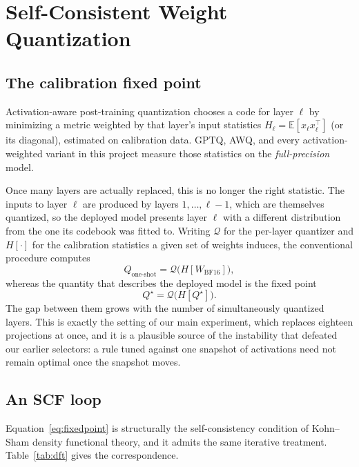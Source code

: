 \section{Self-Consistent Weight Quantization}
\label{sec:scq}

\subsection{The calibration fixed point}

Activation-aware post-training quantization chooses a code for layer $\ell$ by
minimizing a metric weighted by that layer's input statistics
$H_\ell=\mathbb E[x_\ell x_\ell^\top]$ (or its diagonal), estimated on
calibration data. GPTQ, AWQ, and every activation-weighted variant in this
project measure those statistics on the \emph{full-precision} model.

Once many layers are actually replaced, this is no longer the right statistic.
The inputs to layer $\ell$ are produced by layers $1,\dots,\ell-1$, which are
themselves quantized, so the deployed model presents layer $\ell$ with a
different distribution from the one its codebook was fitted to. Writing
$\mathcal Q$ for the per-layer quantizer and $H[\cdot]$ for the calibration
statistics a given set of weights induces, the conventional procedure computes
\begin{equation}
 Q_{\text{one-shot}} = \mathcal Q\bigl(H[W_{\text{BF16}}]\bigr),
\end{equation}
whereas the quantity that describes the deployed model is the fixed point
\begin{equation}
 Q^\star = \mathcal Q\bigl(H[Q^\star]\bigr).
 \label{eq:fixedpoint}
\end{equation}
The gap between them grows with the number of simultaneously quantized layers.
This is exactly the setting of our main experiment, which replaces eighteen
projections at once, and it is a plausible source of the instability that
defeated our earlier selectors: a rule tuned against one snapshot of
activations need not remain optimal once the snapshot moves.

\subsection{An SCF loop}

Equation~\eqref{eq:fixedpoint} is structurally the self-consistency condition of
Kohn--Sham density functional theory, and it admits the same iterative
treatment. Table~\ref{tab:dft} gives the correspondence.

